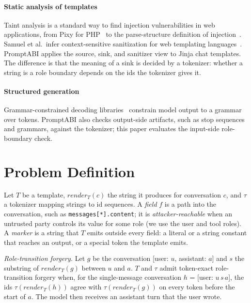 \documentclass[10pt,conference]{IEEEtran}
\newcommand{\tool}{PromptABI\xspace}
\begin{document}
\paragraph{Static analysis of templates} Taint analysis is a standard way to
find injection vulnerabilities in web applications, from Pixy for
PHP~\cite{jovanovic2006pixy} to the parse-structure definition of
injection~\cite{su2006essence}. Samuel et al.\ infer context-sensitive
sanitization for web templating languages~\cite{samuel2011autosanitization}.
\tool applies the source, sink, and sanitizer view to Jinja chat templates.
The difference is that the meaning of a sink is decided by a tokenizer: whether
a string is a role boundary depends on the ids the tokenizer gives it.

\paragraph{Structured generation} Grammar-constrained decoding
libraries~\cite{willard2023outlines,dong2024xgrammar,geng2023grammar} constrain
model output to a grammar over tokens. \tool also checks output-side artifacts,
such as stop sequences and grammars, against the tokenizer; this paper
evaluates the input-side role-boundary check.

\section{Problem Definition}
\label{sec:problem}

Let $T$ be a template, $\mathit{render}_T(c)$ the string it produces for
conversation $c$, and $\tau$ a tokenizer mapping strings to id sequences. A
\emph{field} $f$ is a path into the conversation, such as
\texttt{messages[*].content}; it is \emph{attacker-reachable} when an untrusted
party controls its value for some role (we use the user and tool roles). A
\emph{marker} is a string that $T$ emits outside every field: a literal or a
string constant that reaches an output, or a special token the template emits.

\emph{Role-transition forgery.} Let $g$ be the conversation [user: $u$,
assistant: $a$] and $s$ the substring of $\mathit{render}_T(g)$ between $u$
and $a$. $T$ and $\tau$ admit token-exact role-transition forgery when, for the
single-message conversation $h$ = [user: $u\,s\,a$], the ids
$\tau(\mathit{render}_T(h))$ agree with $\tau(\mathit{render}_T(g))$ on every
token before the start of $a$. The model then receives an assistant turn that
the user wrote.
\end{document}
